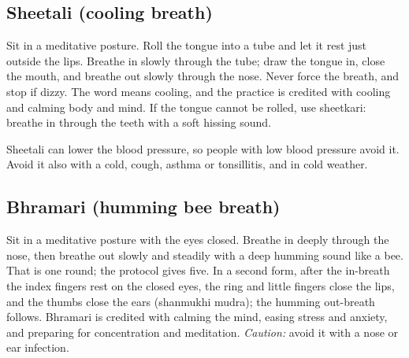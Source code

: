 \subsection*{Sheetali (cooling breath)}
Sit in a meditative posture. Roll the tongue into a tube and let it rest just outside the lips. Breathe in slowly through the tube; draw the tongue in, close the mouth, and breathe out slowly through the nose. Never force the breath, and stop if dizzy. The word means cooling, and the practice is credited with cooling and calming body and mind. If the tongue cannot be rolled, use sheetkari: breathe in through the teeth with a soft hissing sound.

\begin{caution}
Sheetali can lower the blood pressure, so people with low blood pressure avoid it. Avoid it also with a cold, cough, asthma or tonsillitis, and in cold weather.
\end{caution}

\subsection*{Bhramari (humming bee breath)}
Sit in a meditative posture with the eyes closed. Breathe in deeply through the nose, then breathe out slowly and steadily with a deep humming sound like a bee. That is one round; the protocol gives five. In a second form, after the in-breath the index fingers rest on the closed eyes, the ring and little fingers close the lips, and the thumbs close the ears (shanmukhi mudra); the humming out-breath follows. Bhramari is credited with calming the mind, easing stress and anxiety, and preparing for concentration and meditation.
\textit{Caution:} avoid it with a nose or ear infection.

